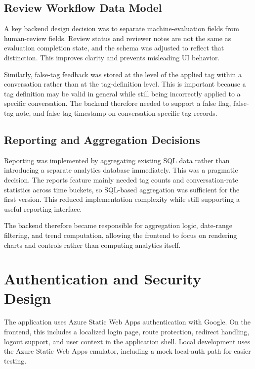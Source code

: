 \documentclass[12pt]{article}
\begin{document}
	\subsection{Review Workflow Data Model}
	
	A key backend design decision was to separate machine-evaluation fields from human-review fields. Review status and reviewer notes are not the same as evaluation completion state, and the schema was adjusted to reflect that distinction. This improves clarity and prevents misleading UI behavior.
	
	Similarly, false-tag feedback was stored at the level of the applied tag within a conversation rather than at the tag-definition level. This is important because a tag definition may be valid in general while still being incorrectly applied to a specific conversation. The backend therefore needed to support a false flag, false-tag note, and false-tag timestamp on conversation-specific tag records.
	
	\subsection{Reporting and Aggregation Decisions}
	
	Reporting was implemented by aggregating existing SQL data rather than introducing a separate analytics database immediately. This was a pragmatic decision. The reports feature mainly needed tag counts and conversation-rate statistics across time buckets, so SQL-based aggregation was sufficient for the first version. This reduced implementation complexity while still supporting a useful reporting interface.
	
	The backend therefore became responsible for aggregation logic, date-range filtering, and trend computation, allowing the frontend to focus on rendering charts and controls rather than computing analytics itself.
	
	\section{Authentication and Security Design}
	
	The application uses Azure Static Web Apps authentication with Google. On the frontend, this includes a localized login page, route protection, redirect handling, logout support, and user context in the application shell. Local development uses the Azure Static Web Apps emulator, including a mock local-auth path for easier testing.
	
\end{document}
